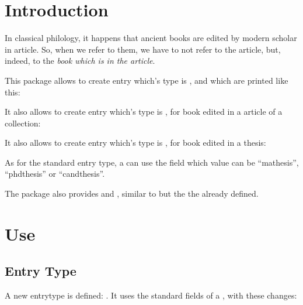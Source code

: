 \documentclass{ltxdockit}[2011/03/25]
\begin{document}
\printtitlepage
\tableofcontents

\section{Introduction}

In classical philology, it happens that ancient books are edited by modern scholar in article. So, when we refer to them, we have to not refer to the article, but, indeed, to the \emph{book which is in the article}.

This package allows to create entry which's type is , and which are printed like this:

\begin{quotation}
\cite{BHG226e}
\end{quotation}

It also allows to create entry which's type is , for book edited in a article of a collection:

\begin{quotation}
  \cite{AcTiteLatin}
\end{quotation}

It also allows to create entry which's type is , for book edited in a thesis:

\begin{quotation}
  \cite{inphd:2015}
\end{quotation}

As for the standard  entry type, a  can use the  field which value can be \enquote{mathesis}, \enquote{phdthesis} or \enquote{candthesis}.

The package also provides  and , similar to  but the the  already defined.

\section{Use}

\subsection{ Entry Type}

A new entrytype is defined: . It uses the standard fields of a , with these changes:
\end{document}
